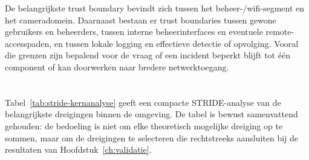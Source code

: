 De belangrijkste trust boundary bevindt zich tussen het beheer-/wifi-segment en het cameradomein. Daarnaast bestaan er trust boundaries tussen gewone gebruikers en beheerders, tussen interne beheerinterfaces en eventuele remote-accesspaden, en tussen lokale logging en effectieve detectie of opvolging. Vooral die grenzen zijn bepalend voor de vraag of een incident beperkt blijft tot één component of kan doorwerken naar bredere netwerktoegang.

%

\section{}%
\label{sec:stride-analyse}

Tabel~\ref{tab:stride-kernanalyse} geeft een compacte STRIDE-analyse van de belangrijkste dreigingen binnen de omgeving. De tabel is bewust samenvattend gehouden: de bedoeling is niet om elke theoretisch mogelijke dreiging op te sommen, maar om de dreigingen te selecteren die rechtstreeks aansluiten bij de resultaten van Hoofdstuk~\ref{ch:validatie}.

